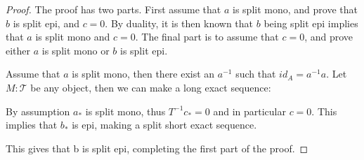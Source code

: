 \documentclass[11pt]{article}
\theoremstyle{definition}
\theoremstyle{remark}
\begin{document}
            \begin{proof}
                The proof has two parts. First assume that $a$ is split mono, and prove that $b$ is split epi, and $c = 0$. By duality, it is then known that $b$ being split epi implies that $a$ is split mono and $c = 0$. The final part is to assume that $c = 0$, and prove either $a$ is split mono or $b$ is split epi.

                Assume that $a$ is split mono, then there exist an $a^{-1}$ such that $id_A = a^{-1}a$. Let $M:\mathcal{T}$ be any object, then we can make a long exact sequence:
                \begin{center}
                \end{center}
                By assumption $a_*$ is split mono, thus $T^{-1}c_* = 0$ and in particular $c = 0$. This implies that $b_*$ is epi, making a split short exact sequence.
                \begin{center}
                \end{center}
                This gives that b is split epi, completing the first part of the proof.


\end{proof}
\end{document}
